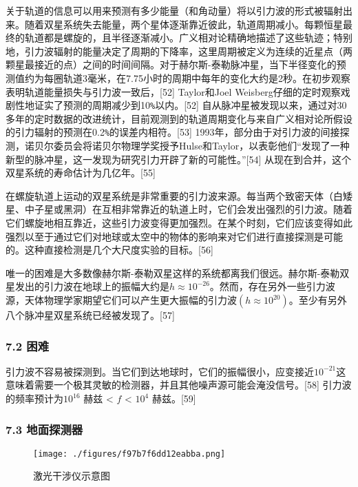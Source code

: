关于轨道的信息可以用来预测有多少能量（和角动量）将以引力波的形式被辐射出来。随着双星系统失去能量，两个星体逐渐靠近彼此，轨道周期减小。每颗恒星最终的轨道都是螺旋的，且半径逐渐减小。广义相对论精确地描述了这些轨迹；特别地，引力波辐射的能量决定了周期的下降率，这里周期被定义为连续的近星点（两颗星最接近的点）之间的时间间隔。对于赫尔斯-泰勒脉冲星，当下半径变化的预测值约为每圈轨道3毫米，在7.75小时的周期中每年的变化大约是2秒。在初步观察表明轨道能量损失与引力波一致后，[52] Taylor和Joel Weisberg仔细的定时观察戏剧性地证实了预测的周期减少到10\verb`%`以内。[52] 自从脉冲星被发现以来，通过对30多年的定时数据的改进统计，目前观测到的轨道周期变化与来自广义相对论所假设的引力辐射的预测在0.2\verb`%`的误差内相符。[53] 1993年，部分由于对引力波的间接探测，诺贝尔委员会将诺贝尔物理学奖授予Hulse和Taylor，以表彰他们“发现了一种新型的脉冲星，这一发现为研究引力开辟了新的可能性。”[54] 从现在到合并，这个双星系统的寿命估计为几亿年。[55]

在螺旋轨道上运动的双星系统是非常重要的引力波来源。每当两个致密天体（白矮星、中子星或黑洞）在互相非常靠近的轨道上时，它们会发出强烈的引力波。随着它们螺旋地相互靠近，这些引力波变得更加强烈。在某个时刻，它们应该变得如此强烈以至于通过它们对地球或太空中的物体的影响来对它们进行直接探测是可能的。这种直接检测是几个大尺度实验的目标。[56]

唯一的困难是大多数像赫尔斯-泰勒双星这样的系统都离我们很远。赫尔斯-泰勒双星发出的引力波在地球上的振幅大约是$h\approx  10^{-26}$。然而，存在另外一些引力波源，天体物理学家期望它们可以产生更大振幅的引力波$(h \approx 10^{20})$。至少有另外八个脉冲星双星系统已经被发现了。[57]

\subsubsection{7.2 困难}

引力波不容易被探测到。当它们到达地球时，它们的振幅很小，应变接近$10^{-21}$这意味着需要一个极其灵敏的检测器，并且其他噪声源可能会淹没信号。[58] 引力波的频率预计为$10^{16}$ 赫兹 < $f$ < $10^{4}$ 赫兹。[59]

\subsubsection{7.3 地面探测器}

\begin{figure}[ht]
\centering
\texttt{[image: ./figures/f97b7f6dd12eabba.png]}
\caption{激光干涉仪示意图} \label{fig_YLB_10}
\end{figure}

